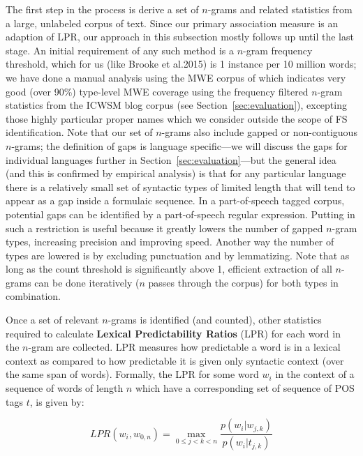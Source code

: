 \documentclass[11pt,letterpaper]{article}
\makeatletter
\def \al {al.\@ }
\newcommand{\termdef}[1]{\textbf{#1}\xspace}
\newcommand{\secref}[2][]{Section#1~\ref{#2}\xspace}
\makeatother
\begin{document}
The first step in the process is derive a set of $n$-grams and related statistics from a large, unlabeled corpus of text. Since our primary association measure is an adaption of LPR, our approach in this subsection mostly follows  up until the last stage. An initial requirement of any such method is a $n$-gram frequency threshold, which for us (like Brooke et \al 2015) is 1 instance per 10 million words; we have done a manual analysis using the MWE corpus of  which indicates very good (over 90\%) type-level MWE coverage using the frequency filtered $n$-gram statistics from the ICWSM blog corpus (see \secref{sec:evaluation}), excepting those highly particular proper names which we consider outside the scope of FS identification. Note that our set of $n$-grams also include gapped or non-contiguous $n$-grams; the definition of gaps is language specific---we will discuss the gaps for individual languages further in \secref{sec:evaluation}---but the general idea (and this is confirmed by empirical analysis) is that for any particular language there is a relatively small set of syntactic types of limited length that will tend to appear as a gap inside a formulaic sequence. In a part-of-speech tagged corpus, potential gaps can be identified by a part-of-speech regular expression. Putting in such a restriction is useful because it greatly lowers the number of gapped $n$-gram types, increasing precision and improving speed. Another way the number of types are lowered is by excluding punctuation and by lemmatizing.  Note that as long as the count threshold is significantly above 1, efficient extraction of all $n$-grams can be done iteratively ($n$ passes through the corpus) for both types in combination. 

Once a set of relevant $n$-grams is identified (and counted), other statistics required to calculate \termdef{Lexical Predictability Ratios} (LPR) for each word in the $n$-gram are collected. LPR measures how predictable a word is in a lexical context as compared to how predictable it is given only syntactic context (over the same span of words). Formally, the LPR for some word $w_i$ in the context of a sequence of words of length $n$ which have a corresponding set of sequence of POS tags $t$, is given by:

\begin{displaymath}
LPR(w_i,w_{0,n}) = \max_{0 \leq j < k < n }{\frac{p(w_i|w_{j,k})}{p(w_i|t_{j,k})}}
\end{displaymath}
\end{document}
